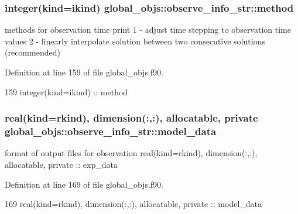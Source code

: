 \subsubsection[{method}]{\setlength{\rightskip}{0pt plus 5cm}integer(kind=ikind) global\+\_\+objs\+::observe\+\_\+info\+\_\+str\+::method}\label{structglobal__objs_1_1observe__info__str_a9daab35c8e37b96fdf0c2304c15a95b6}


methods for observation time print 1 -\/ adjust time stepping to observation time values 2 -\/ linearly interpolate solution between two consecutive solutions (recommended) 



Definition at line 159 of file global\+\_\+objs.\+f90.


\begin{DoxyCode}
159     \textcolor{keywordtype}{integer(kind=ikind)} :: method
\end{DoxyCode}
\subsubsection[{model\+\_\+data}]{\setlength{\rightskip}{0pt plus 5cm}real(kind=rkind), dimension(\+:,\+:), allocatable, private global\+\_\+objs\+::observe\+\_\+info\+\_\+str\+::model\+\_\+data\hspace{0.3cm}{\ttfamily [private]}}\label{structglobal__objs_1_1observe__info__str_a4054a4f436394b001ac209384ee1dbc4}


format of output files for observation real(kind=rkind), dimension(\+:,\+:), allocatable, private \+:\+: exp\+\_\+data 



Definition at line 169 of file global\+\_\+objs.\+f90.


\begin{DoxyCode}
169   \textcolor{keywordtype}{real(kind=rkind)}, \textcolor{keywordtype}{dimension(:,:)}, \textcolor{keywordtype}{allocatable}, \textcolor{keywordtype}{private} :: model\_data
\end{DoxyCode}
